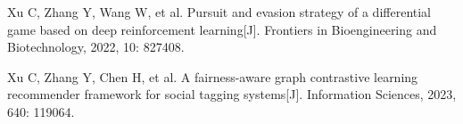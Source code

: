 
\begin{cventries}


\cvintro
{
    \begin{cvitems} %
        \item {Xu C, Zhang Y, Wang W, et al. Pursuit and evasion strategy of a differential game based on deep reinforcement learning[J]. Frontiers in Bioengineering and Biotechnology, 2022, 10: 827408.}
        \item {Xu C, Zhang Y, Chen H, et al. A fairness-aware graph contrastive learning recommender framework for social tagging systems[J]. Information Sciences, 2023, 640: 119064.}
    \end{cvitems}
}

\end{cventries}